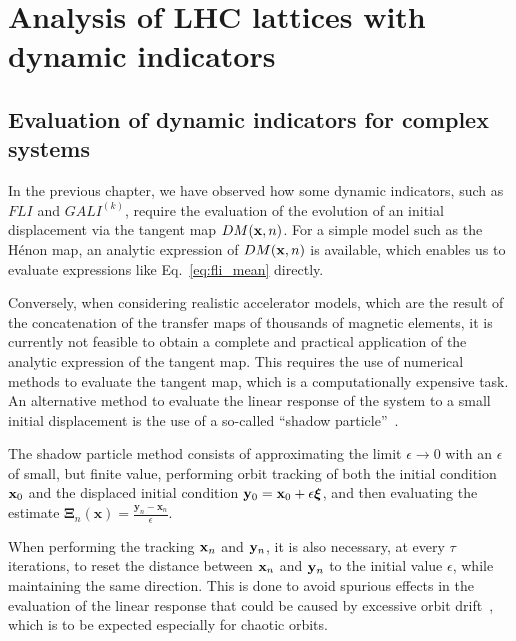 \chapter{Analysis of LHC lattices with dynamic indicators}\label{ch:dyn-lhc}

\section{Evaluation of dynamic indicators for complex systems}

In the previous chapter, we have observed how some dynamic indicators, such as $FLI$ and $GALI^{(k)}$, require the evaluation of the evolution of an initial displacement via the tangent map $DM(\vb{x}, n)$. For a simple model such as the Hénon map, an analytic expression of $DM(\vb{x}, n)$ is available, which enables us to evaluate expressions like Eq.~\ref{eq:fli_mean} directly.

Conversely, when considering realistic accelerator models, which are the result of the concatenation of the transfer maps of thousands of magnetic elements, it is currently not feasible to obtain a complete and practical application of the analytic expression of the tangent map. This requires the use of numerical methods to evaluate the tangent map, which is a computationally expensive task. An alternative method to evaluate the linear response of the system to a small initial displacement is the use of a so-called ``shadow particle''~\cite{Skokos2010b}.

The shadow particle method consists of approximating the limit $\epsilon\to 0$ with an $\epsilon$ of small, but finite value, performing orbit tracking of both the initial condition $\vb{x}_0$ and the displaced initial condition $\vb{y}_0 = \vb{x}_0 + \epsilon \boldsymbol{\xi}$, and then evaluating the estimate $\boldsymbol{\Xi}_{n}(\mathbf{x})=\frac{\mathbf{y}_{n}-\mathbf{x}_{n}}{\epsilon}$.

When performing the tracking $\vb{x}_n$ and $\vb{y}_n$, it is also necessary, at every $\tau$ iterations, to reset the distance between $\vb{x}_n$ and $\vb{y}_n$ to the initial value $\epsilon$, while maintaining the same direction. This is done to avoid spurious effects in the evaluation of the linear response that could be caused by excessive orbit drift~\cite{Skokos2010b}, which is to be expected especially for chaotic orbits.


